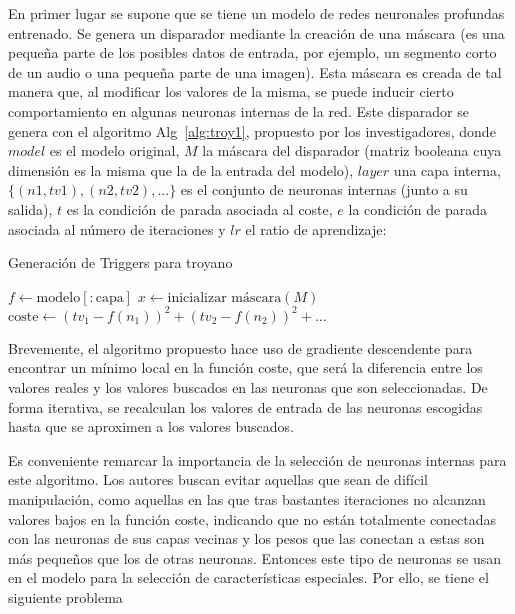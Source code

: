En primer lugar se supone que se tiene un modelo de redes neuronales profundas entrenado. Se genera un disparador mediante la creación de una máscara (es una pequeña parte de los posibles datos de entrada, por ejemplo, un segmento corto de un audio o una pequeña parte de una imagen). Esta máscara es creada de tal manera que, al modificar los valores de la misma, se puede inducir cierto comportamiento en algunas neuronas internas de la red. Este disparador se genera con el algoritmo Alg~\ref{alg:troy1}, propuesto por los investigadores, donde $model$ es el modelo original, $M$ la máscara del disparador (matriz booleana cuya dimensión es la misma que la de la entrada del modelo), $layer$ una capa interna, $\{(n1,tv1),(n2,tv2),...\}$ es el conjunto de neuronas internas (junto a su salida), $t$ es la condición de parada asociada al coste, $e$ la condición de parada asociada al número de iteraciones y $lr$ el ratio de aprendizaje:

\begin{algorithm}
\caption{Generación de Triggers para troyano}\label{alg:troy1}
\BlankLine
$f \leftarrow \text{modelo}[: \text{capa}]$\;
$x \leftarrow \text{inicializar máscara}(M)$\;
$\text{coste} \leftarrow (tv_1 - f(n_1))^2 + (tv_2 - f(n_2))^2 + \ldots$\;
\end{algorithm}

Brevemente, el algoritmo propuesto hace uso de gradiente descendente para encontrar un mínimo local en la función coste, que será la diferencia entre los valores reales y los valores buscados en las neuronas que son seleccionadas. De forma iterativa, se recalculan los valores de entrada de las neuronas escogidas hasta que se aproximen a los valores buscados.

Es conveniente remarcar la importancia de la selección de neuronas internas para este algoritmo. Los autores buscan evitar aquellas que sean de difícil manipulación, como aquellas en las que tras bastantes iteraciones no alcanzan valores bajos en la función coste, indicando que no están totalmente conectadas con las neuronas de sus capas vecinas y los pesos que las conectan a estas son más pequeños que los de otras neuronas. Entonces este tipo de neuronas se usan en el modelo para la selección de características especiales. Por ello, se tiene el siguiente problema

